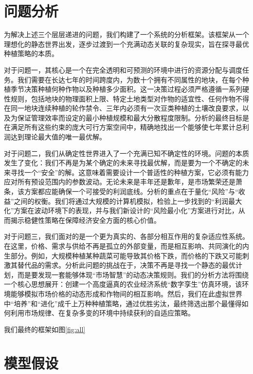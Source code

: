 \documentclass[withoutpreface,bwprint]{cumcmthesis} %
\begin{document}
\section{问题分析}


为解决上述三个层层递进的问题，我们构建了一个系统的分析框架。该框架从一个理想化的静态世界出发，逐步过渡到一个充满动态关联的复杂现实，旨在探寻最优种植策略的本质。

对于问题一，其核心是一个在完全透明和可预测的环境中进行的资源分配与调度任务。我们需要在长达七年的时间跨度内，为数十个拥有不同属性的地块，在每个种植季节决策种植何种作物以及种植多少面积。这一决策过程必须严格遵循一系列硬性规则，包括地块的物理面积上限、特定土地类型对作物的适宜性、任何作物不得在同一地块连续种植的轮作禁令、三年内必须有一次豆类种植的土壤改良要求，以及为保证管理效率而设定的最小种植规模和最大分散程度限制。分析的最终目标是在满足所有这些约束的庞大可行方案空间中，精确地找出一个能够使七年累计总利润达到理论最大值的唯一最优解。

对于问题二，我们从确定性世界进入了一个充满已知不确定性的环境。问题的本质发生了变化：我们不再是为某个确定的未来寻找最优解，而是要为一个不确定的未来寻找一个“安全”的解。这意味着需要设计一个普适性的种植方案，它必须有能力应对所有预设范围内的参数波动。无论未来是丰年还是歉年，是市场繁荣还是萧条，该方案都应能确保一个可接受的利润底线。分析的重点在于量化“风险”与“收益”之间的权衡。我们将通过大规模的计算机模拟，检验上一步找到的“利润最大化”方案在波动环境下的表现，并与我们新设计的“风险最小化”方案进行对比，从而揭示稳健性策略在保障经济安全方面的核心价值。

对于问题三，我们面对的是一个更为真实的、各部分相互作用的复杂适应性系统。在这里，价格、需求与供给不再是孤立的外部变量，而是相互影响、共同演化的内生部分。例如，大规模种植某种蔬菜可能导致其价格下跌，而价格的下跌又可能刺激其替代品的需求。分析此问题的挑战在于，决策不再是寻找一个静态的最优计划，而是要发现一套能够体现“市场智慧”的动态决策规则。我们的分析方法将围绕一个核心思想展开：创建一个高度逼真的农业经济系统“数字孪生”仿真环境，该环境能够模拟市场价格的动态形成和作物间的相互影响。然后，我们在此虚拟世界中“培养”和“进化”成千上万种种植策略，通过优胜劣汰，最终筛选出那个最懂得如何利用市场规律、在复杂多变的环境中持续获利的自适应策略。

我们最终的框架如图\ref{fig:all}







\section{模型假设}
\end{document}
